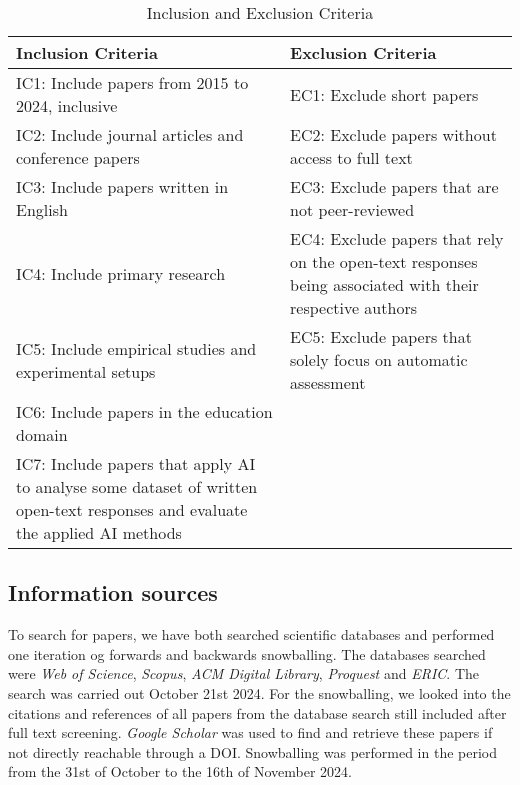 \begin{table}[h!]
\centering
\caption{Inclusion and Exclusion Criteria}
\label{tab:eligibilitycriteria}
\begin{tabularx}{\textwidth}{|X|X|}
\hline
\textbf{Inclusion Criteria} & \textbf{Exclusion Criteria} \\
\hline
IC1: Include papers from 2015 to 2024, inclusive & EC1: Exclude short papers \\
\hline
IC2: Include journal articles and conference papers & EC2: Exclude papers without access to full text \\
\hline
IC3: Include papers written in English & EC3: Exclude papers that are not peer-reviewed \\
\hline
IC4: Include primary research & EC4: Exclude papers that rely on the open-text responses being associated with their respective authors \\
\hline
IC5: Include empirical studies and experimental setups & EC5: Exclude papers that solely focus on automatic assessment \\
\hline
IC6: Include papers in the education domain & \\
\hline
IC7: Include papers that apply AI to analyse some dataset of written open-text responses and evaluate the applied AI methods & \\
\hline
\end{tabularx}
\end{table}

\subsection{Information sources}
To search for papers, we have both searched scientific databases and performed one iteration og forwards and backwards snowballing. The databases searched were \textit{Web of Science}, \textit{Scopus}, \textit{ACM Digital Library}, \textit{Proquest} and \textit{ERIC}. The search was carried out October 21st 2024. For the snowballing, we looked into the citations and references of all papers from the database search still included after full text screening. \textit{Google Scholar} was used to find and retrieve these papers if not directly reachable through a DOI. Snowballing was performed in the period from the 31st of October to the 16th of November 2024.


